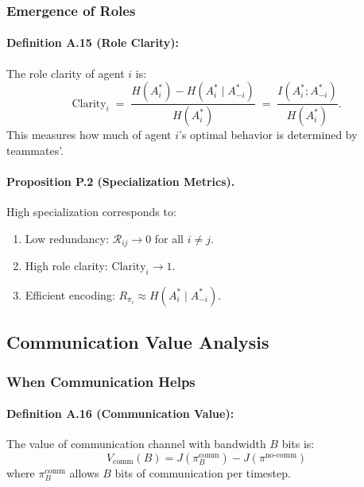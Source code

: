 \documentclass[10pt, letterpaper]{article}
\begin{document}
\subsubsection{Emergence of Roles}

\paragraph{Definition A.15 (Role Clarity):} The role clarity of agent $i$ is:
\[\text{Clarity}_i \;=\; \frac{H(A_i^*) - H(A_i^* \mid A_{-i}^*)}{H(A_i^*)} \;=\; \frac{I(A_i^*; A_{-i}^*)}{H(A_i^*)}.\]
This measures how much of agent $i$'s optimal behavior is determined by teammates'.

\paragraph{Proposition P.2 (Specialization Metrics).} High specialization corresponds to:
\begin{enumerate}
    \item Low redundancy: $\mathcal{R}_{ij} \to 0$ for all $i \neq j$.
    \item High role clarity: $\text{Clarity}_i \to 1$.
    \item Efficient encoding: $R_{\pi_i} \approx H(A_i^* \mid A_{-i}^*)$.
\end{enumerate}

\subsection{Communication Value Analysis}

\subsubsection{When Communication Helps}

\paragraph{Definition A.16 (Communication Value):} The value of communication channel with bandwidth $B$ bits is:
\[V_{\text{comm}}(B) = J(\pi^{\text{comm}}_B) - J(\pi^{\text{no-comm}})\]
where $\pi^{\text{comm}}_B$ allows $B$ bits of communication per timestep.
\end{document}
